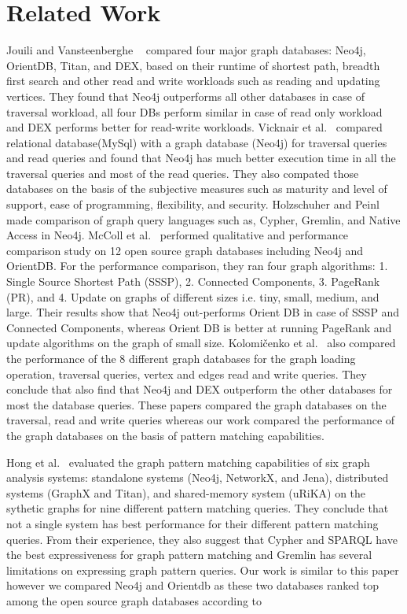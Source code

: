 
\section{Related Work}
Jouili and Vansteenberghe ~\cite{jouili2013empirical} compared four major graph databases: Neo4j, OrientDB, Titan, and DEX, based on their runtime of shortest path, breadth first search and other read and write workloads such as reading and updating vertices. They found that Neo4j outperforms all other databases in case of traversal workload, all four DBs perform similar in case of read only workload and DEX performs better for read-write workloads.  
Vicknair et al.~\cite{vicknair2010comparison} compared relational database(MySql) with a graph database (Neo4j) for traversal queries and read queries and found that Neo4j has much better execution time in all the traversal queries and most of the read queries. They also compated those databases on the basis of the subjective measures such as maturity and level of support, ease of programming, flexibility,
and security.
Holzschuher and Peinl ~\cite{holzschuher2013performance} made comparison of graph query languages such as, Cypher, Gremlin, and Native Access in Neo4j.  
McColl et al.~\cite{mccoll2014performance} performed qualitative and performance comparison study on 12 open source graph databases including Neo4j and OrientDB. For the performance comparison, they ran four graph algorithms: 1. Single Source Shortest Path (SSSP), 2. Connected Components, 3. PageRank (PR), and
4. Update on graphs of different sizes i.e. tiny, small, medium, and
large. Their results show that Neo4j out-performs Orient DB in case of SSSP and Connected Components, whereas Orient DB is better at running PageRank and update algorithms on the graph of small size.
Kolomičenko et al.~\cite{kolomivcenko2013experimental} also compared the performance of the 8 different graph databases for the graph loading operation, traversal queries, vertex and edges read and write queries. They conclude that also find that Neo4j and DEX outperform the other databases for most the database queries. These papers compared the graph databases on the traversal, read and write queries whereas our work compared the performance of the graph databases on the basis of pattern matching capabilities.

Hong et al.~\cite{hong2016evaluation} evaluated the graph pattern matching capabilities of six graph analysis systems: standalone systems (Neo4j, NetworkX, and Jena), distributed systems (GraphX and Titan), and shared-memory system (uRiKA) on the sythetic graphs for nine different pattern matching queries. They conclude that not a single system has best performance for their different pattern matching queries. From their experience, they also suggest that Cypher and SPARQL have the best expressiveness for graph pattern matching and Gremlin has several limitations on expressing graph pattern queries.
Our work is similar to this paper however we compared Neo4j and Orientdb as these two databases ranked top among the open source graph databases according to ~\cite{dbranking}

